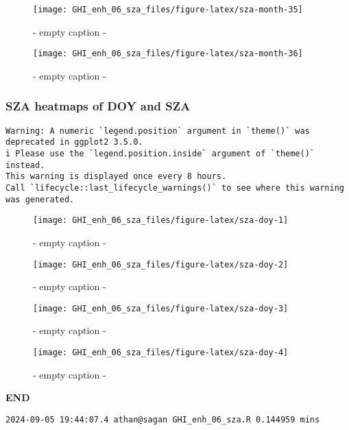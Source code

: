 \documentclass[
  10pt,
  a4paper,oneside]{article}
\begin{document}
\begin{figure}[H]

{\centering \texttt{[image: GHI\_enh\_06\_sza\_files/figure-latex/sza-month-35]} 

}

\caption{ - empty caption - }\label{fig:sza-month-35}
\end{figure}
\begin{figure}[H]

{\centering \texttt{[image: GHI\_enh\_06\_sza\_files/figure-latex/sza-month-36]} 

}

\caption{ - empty caption - }\label{fig:sza-month-36}
\end{figure}

\newpage
\FloatBarrier

\hypertarget{sza-heatmaps-of-doy-and-sza}{%
\subsubsection{SZA heatmaps of DOY and SZA}\label{sza-heatmaps-of-doy-and-sza}}

\begin{verbatim}
Warning: A numeric `legend.position` argument in `theme()` was deprecated in ggplot2 3.5.0.
i Please use the `legend.position.inside` argument of `theme()` instead.
This warning is displayed once every 8 hours.
Call `lifecycle::last_lifecycle_warnings()` to see where this warning was generated.
\end{verbatim}

\begin{figure}[H]

{\centering \texttt{[image: GHI\_enh\_06\_sza\_files/figure-latex/sza-doy-1]} 

}

\caption{ - empty caption - }\label{fig:sza-doy-1}
\end{figure}
\begin{figure}[H]

{\centering \texttt{[image: GHI\_enh\_06\_sza\_files/figure-latex/sza-doy-2]} 

}

\caption{ - empty caption - }\label{fig:sza-doy-2}
\end{figure}
\begin{figure}[H]

{\centering \texttt{[image: GHI\_enh\_06\_sza\_files/figure-latex/sza-doy-3]} 

}

\caption{ - empty caption - }\label{fig:sza-doy-3}
\end{figure}
\begin{figure}[H]

{\centering \texttt{[image: GHI\_enh\_06\_sza\_files/figure-latex/sza-doy-4]} 

}

\caption{ - empty caption - }\label{fig:sza-doy-4}
\end{figure}

\textbf{END}

\begin{verbatim}
2024-09-05 19:44:07.4 athan@sagan GHI_enh_06_sza.R 0.144959 mins
\end{verbatim}
\end{document}
